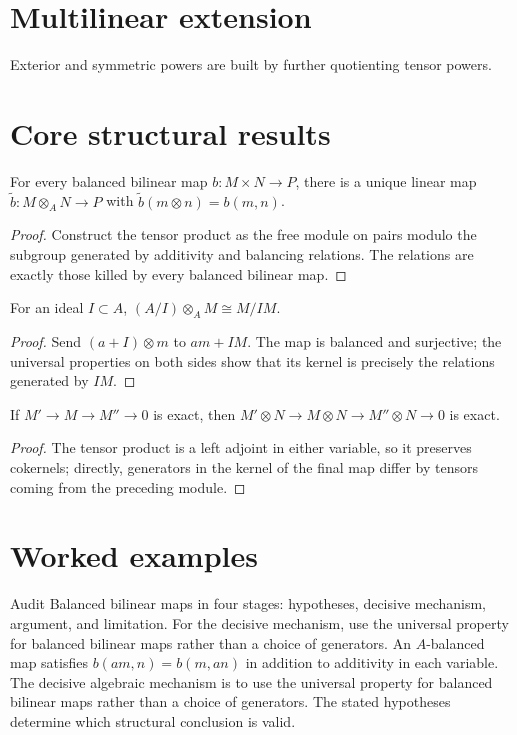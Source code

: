 \section{Multilinear extension}
Exterior and symmetric powers are built by further quotienting tensor powers.

\section{Core structural results}

\begin{theorem}\label{thm:v10-01}
For every balanced bilinear map $b:M\times N\to P$, there is a unique linear map $\widetilde b:M\otimes_A N\to P$ with $\widetilde b(m\otimes n)=b(m,n)$.
\begin{proof}
Construct the tensor product as the free module on pairs modulo the subgroup generated by additivity and balancing relations. The relations are exactly those killed by every balanced bilinear map.
\end{proof}
\end{theorem}

\begin{theorem}\label{thm:v10-02}
For an ideal $I\subset A$, $(A/I)\otimes_A M\cong M/IM$.
\begin{proof}
Send $(a+I)\otimes m$ to $am+IM$. The map is balanced and surjective; the universal properties on both sides show that its kernel is precisely the relations generated by $I M$.
\end{proof}
\end{theorem}

\begin{theorem}\label{thm:v10-03}
If $M'\to M\to M''\to0$ is exact, then $M'\otimes N\to M\otimes N\to M''\otimes N\to0$ is exact.
\begin{proof}
The tensor product is a left adjoint in either variable, so it preserves cokernels; directly, generators in the kernel of the final map differ by tensors coming from the preceding module.
\end{proof}
\end{theorem}

\section{Worked examples}

\begin{example}\label{ex:v10-worked-01}
Audit Balanced bilinear maps in four stages: hypotheses, decisive mechanism, argument, and limitation. For the decisive mechanism, use the universal property for balanced bilinear maps rather than a choice of generators. An $A$-balanced map satisfies $b(am,n)=b(m,an)$ in addition to additivity in each variable. The decisive algebraic mechanism is to use the universal property for balanced bilinear maps rather than a choice of generators. The stated hypotheses determine which structural conclusion is valid.
\end{example}


